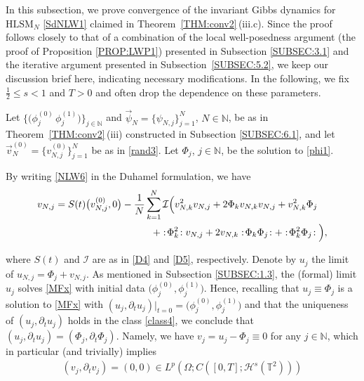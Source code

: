 \documentclass[letterpaper, 11pt,  reqno]{amsart}
\newcommand{\1}{\hspace{0.5mm}\text{I}\hspace{0.2mm}}
\newcommand{\noi}{\noindent}
\newcommand{\T}{\mathbb{T}}
\newcommand{\N}{\mathbb{N}}
\renewcommand{\H}{\mathcal{H}}
\newcommand{\dt}{\partial_t}
\newcommand{\HLS}{$\text{HLSM}_N$ }
\newcommand{\wick}[1]{:\!{#1}\!:}
\newcommand{\I}{\mathcal{I}}
\renewcommand{\O}{\Omega}
\numberwithin{equation}{section}
\numberwithin{theorem}{section}
\begin{document}
In this subsection, we prove  convergence
of the invariant Gibbs dynamics for \HLS \eqref{SdNLW1}
claimed
in Theorem~\ref{THM:conv2}\,(iii.c).
Since the proof follows closely to that of
a combination of the local well-posedness argument
(the proof of Proposition \ref{PROP:LWP1})
presented 
in Subsection \ref{SUBSEC:3.1}
and the iterative argument
presented in Subsection~\ref{SUBSEC:5.2}, 
we keep our discussion brief here, 
indicating necessary modifications.
In the following, we fix
 $\frac 12 \le s < 1$
 and $T > 0$
 and often drop the dependence
on these parameters.

 







Let 
 $\big\{ \big(\phi^{(0)}_{j}\, \phi^{(1)}_{j}\big)\big \}_{j \in \N}$ and 
 $\vec \psi_N = \{\psi_{N, j}\}_{j = 1}^N$, $N \in \N$,  
be as in  
 Theorem~\ref{THM:conv2}\,(iii)
 constructed in Subsection \ref{SUBSEC:6.1}, 
 and let 
 $\vec v^{(0)}_N= \big\{v^{(0)}_{N, j}\big\}_{j = 1}^N$
be as in \eqref{rand3}.
Let $\Phi_j$, $j \in \N$, be the solution to \eqref{phi1}.




By writing \eqref{NLW6} in the Duhamel formulation, we have 
\begin{align}
\begin{split}
v_{N, j} 
& = S(t) \big( v_{N, j}^{(0)}, 0 \big) 
- \frac{1}{N} \sum_{k = 1}^N  \I\Big( 
v_{N, k}^2 v_{N, j}
+ 2 \Phi_k v_{N, k} v_{N, j}
  + v_{N, k}^2 \Phi_j \\
& 
\hphantom{XXXXXXXXXXX}
 + \wick{\Phi_k^2} v_{N, j} + 2 v_{N, k} \wick{ \Phi_k \Phi_j } 
+ \wick{\Phi_k^2 \Phi_j} \Big), 
\end{split}
\label{KN1}
\end{align}


\noi
where $S (t)$ and $\I$ are as in  \eqref{D4} and  \eqref{D5}, 
respectively.
Denote by $u_j$ the limit
of $u_{N, j} = \Phi_j + v_{N, j}$.
As mentioned in Subsection \ref{SUBSEC:1.3}, 
the (formal) limit $u_j$ solves \eqref{MFx} 
with  initial data $\big(\phi^{(0)}_j, \phi^{(1)}_j\big)$.
Hence, recalling  
 that 
 $u_j \equiv \Phi_j$
is a solution to \eqref{MFx}
with  $(u_j, \dt u_j)|_{t = 0} = \big(\phi^{(0)}_j, \phi^{(1)}_j\big)$
and 
that the uniqueness
of $(u_j, \dt u_j)$ holds  in the class \eqref{class4}, 
we conclude that 
$(u_j, \dt u_j)  = (\Phi_j, \dt \Phi_j)$.
Namely, we have $v_j = u_j  - \Phi_j\equiv 0$ for any $j \in \N$, 
which in particular (and trivially) implies
\begin{align*}
(v_j, \dt v_j) = (0, 0)  \in 
L^p(\O; C([0, T]; \H^s(\T^2)))
\end{align*}
\end{document}
